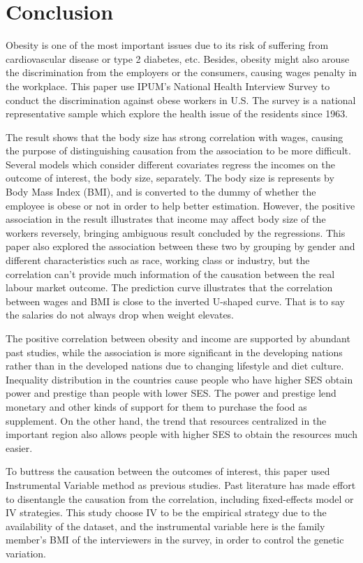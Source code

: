 \documentclass{article}
\begin{document}
\section{Conclusion}
Obesity is one of the most important issues due to its risk of suffering from cardiovascular disease or type 2 diabetes, etc. Besides, obesity might also arouse the discrimination from the employers or the consumers, causing wages penalty in the workplace. This paper use IPUM's National Health Interview Survey to conduct the discrimination against obese workers in U.S. The survey is a national representative sample which explore the health issue of the residents since 1963.
\par
\setlength{\parindent}{2em}
The result shows that the body size has strong correlation with wages, causing the purpose of distinguishing causation from the association to be more difficult. Several models which consider different covariates regress the incomes on the outcome of interest, the body size, separately. The body size is represents by Body Mass Index (BMI), and is converted to the dummy of whether the employee is obese or not in order to help better estimation. However, the positive association in the result illustrates that income may affect body size of the workers reversely, bringing ambiguous result concluded by the regressions. This paper also explored the association between these two by grouping by gender and different characteristics such as race, working class or industry, but the correlation can't provide much information of the causation between the real labour market outcome. The prediction curve illustrates that the correlation between wages and BMI is close to the inverted U-shaped curve. That is to say the salaries do not always drop when weight elevates. 
\par
\setlength{\parindent}{2em}
The positive correlation between obesity and income are supported by abundant past studies, while the association is more significant in the developing nations rather than in the developed nations due to changing lifestyle and diet culture. Inequality distribution in the countries cause people who have higher SES obtain power and prestige than people with lower SES. The power and prestige lend monetary and other kinds of support for them to purchase the food as supplement. On the other hand, the trend that resources centralized in the important region also allows people with higher SES to obtain the resources much easier.    
\par
\setlength{\parindent}{2em}
To buttress the causation between the outcomes of interest, this paper used Instrumental Variable method as previous studies. Past literature has made effort to disentangle the causation from the correlation, including fixed-effects model or IV strategies. This study choose IV to be the empirical strategy due to the availability of the dataset, and the instrumental variable here is the family member's BMI of the interviewers in the survey, in order to control the genetic variation.
\end{document}
